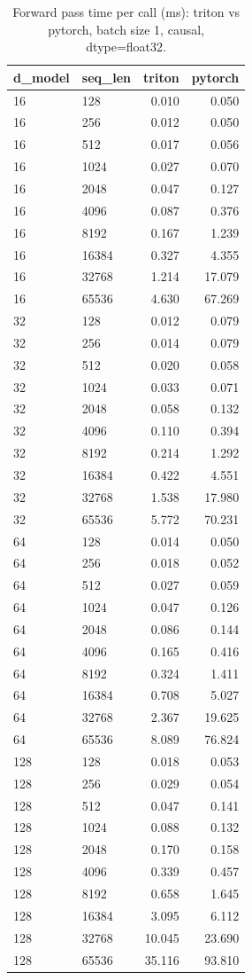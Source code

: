 \begin{table}
\centering
\begin{tabular}{llrr}
\toprule
d\_model & seq\_len & triton & pytorch \\
\midrule
16 & 128 & 0.010 & 0.050 \\
16 & 256 & 0.012 & 0.050 \\
16 & 512 & 0.017 & 0.056 \\
16 & 1024 & 0.027 & 0.070 \\
16 & 2048 & 0.047 & 0.127 \\
16 & 4096 & 0.087 & 0.376 \\
16 & 8192 & 0.167 & 1.239 \\
16 & 16384 & 0.327 & 4.355 \\
16 & 32768 & 1.214 & 17.079 \\
16 & 65536 & 4.630 & 67.269 \\
32 & 128 & 0.012 & 0.079 \\
32 & 256 & 0.014 & 0.079 \\
32 & 512 & 0.020 & 0.058 \\
32 & 1024 & 0.033 & 0.071 \\
32 & 2048 & 0.058 & 0.132 \\
32 & 4096 & 0.110 & 0.394 \\
32 & 8192 & 0.214 & 1.292 \\
32 & 16384 & 0.422 & 4.551 \\
32 & 32768 & 1.538 & 17.980 \\
32 & 65536 & 5.772 & 70.231 \\
64 & 128 & 0.014 & 0.050 \\
64 & 256 & 0.018 & 0.052 \\
64 & 512 & 0.027 & 0.059 \\
64 & 1024 & 0.047 & 0.126 \\
64 & 2048 & 0.086 & 0.144 \\
64 & 4096 & 0.165 & 0.416 \\
64 & 8192 & 0.324 & 1.411 \\
64 & 16384 & 0.708 & 5.027 \\
64 & 32768 & 2.367 & 19.625 \\
64 & 65536 & 8.089 & 76.824 \\
128 & 128 & 0.018 & 0.053 \\
128 & 256 & 0.029 & 0.054 \\
128 & 512 & 0.047 & 0.141 \\
128 & 1024 & 0.088 & 0.132 \\
128 & 2048 & 0.170 & 0.158 \\
128 & 4096 & 0.339 & 0.457 \\
128 & 8192 & 0.658 & 1.645 \\
128 & 16384 & 3.095 & 6.112 \\
128 & 32768 & 10.045 & 23.690 \\
128 & 65536 & 35.116 & 93.810 \\
\bottomrule
\end{tabular}
\caption{Forward pass time per call (ms): triton vs pytorch, batch size 1, causal, dtype=float32.}
\label{tab:flash_forward_compare_float32}
\end{table}
